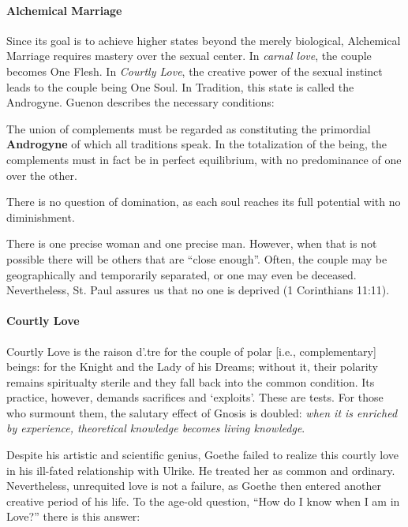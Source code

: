 \paragraph{Alchemical Marriage}
Since its goal is to achieve higher states beyond the merely biological, Alchemical Marriage requires mastery over the sexual center. In \emph{carnal love}, the couple becomes One Flesh. In \emph{Courtly Love}, the creative power of the sexual instinct leads to the couple being One Soul. In Tradition, this state is called the Androgyne. Guenon describes the necessary conditions:

\begin{quotex}
The union of complements must be regarded as constituting the primordial \textbf{Androgyne} of which all traditions speak. In the totalization of the being, the complements must in fact be in perfect equilibrium, with no predominance of one over the other. 

\end{quotex}
There is no question of domination, as each soul reaches its full potential with no diminishment.

There is one precise woman and one precise man. However, when that is not possible there will be others that are “close enough”. Often, the couple may be geographically and temporarily separated, or one may even be deceased. Nevertheless, St. Paul assures us that no one is deprived (1 Corinthians 11:11).

\paragraph{Courtly Love}
\begin{quotex}
Courtly Love is the raison d'.tre for the couple of polar [i.e., complementary] beings: for the Knight and the Lady of his Dreams; without it, their polarity remains spiritualty sterile and they fall back into the common condition. Its practice, however, demands sacrifices and `exploits'. These are tests. For those who surmount them, the salutary effect of Gnosis is doubled: \emph{when it is enriched by experience, theoretical knowledge becomes living knowledge}. 

\end{quotex}
Despite his artistic and scientific genius, Goethe failed to realize this courtly love in his ill-fated relationship with Ulrike. He treated her as common and ordinary. Nevertheless, unrequited love is not a failure, as Goethe then entered another creative period of his life. To the age-old question, “How do I know when I am in Love?” there is this answer:

